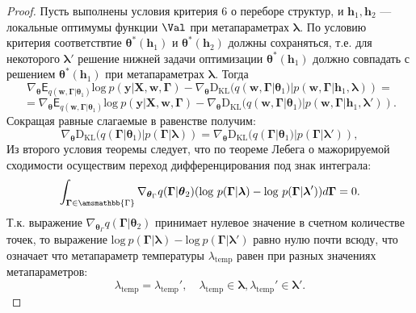 \begin{proof}
Пусть выполнены условия критерия 6 о переборе структур, и $\mathbf{h}_1, \mathbf{h}_2$ --- локальные оптимумы функции $\Val$ при метапараметрах $\boldsymbol{\lambda}$.
По условию критерия соответствтие $\boldsymbol{\theta}^{*}(\mathbf{h}_1)$ и $\boldsymbol{\theta}^{*}(\mathbf{h}_2)$ должны сохраняться, т.е. для некоторого $\boldsymbol{\lambda}'$ решение  нижней задачи оптимизации $\boldsymbol{\theta}^{*}(\mathbf{h}_1)$ должно совпадать с решением $\boldsymbol{\theta}^{*}(\mathbf{h}_1)$ при метапараметрах $\boldsymbol{\lambda}$. Тогда
\[
    \nabla_{\boldsymbol{\theta}} \mathsf{E}_{q(\mathbf{w}, \boldsymbol{\Gamma}|\boldsymbol{\theta}_1)} \text{log}~p(\mathbf{y}|\mathbf{X}, \mathbf{w}, \boldsymbol{\Gamma}) -\nabla_{\boldsymbol{\theta}}  \text{D}_{\text{KL}}(q(\mathbf{w}, \boldsymbol{\Gamma}|\boldsymbol{\theta}_1) | p(\mathbf{w}, \boldsymbol{\Gamma}|\mathbf{h}_1, \boldsymbol{\lambda})) = 
\]
\[
= \nabla_{\boldsymbol{\theta}} \mathsf{E}_{q(\mathbf{w}, \boldsymbol{\Gamma}|\boldsymbol{\theta}_1)} \text{log}~p(\mathbf{y}|\mathbf{X}, \mathbf{w}, \boldsymbol{\Gamma}) - \nabla_{\boldsymbol{\theta}}  \text{D}_{\text{KL}}(q(\mathbf{w}, \boldsymbol{\Gamma}|\boldsymbol{\theta}_1) | p(\mathbf{w}, \boldsymbol{\Gamma}|\mathbf{h}_1, \boldsymbol{\lambda}')).
\]
Сокращая равные слагаемые в равенстве получим:
\[
\nabla_{\boldsymbol{\theta}}  \text{D}_{\text{KL}}(q(\boldsymbol{\Gamma}|\boldsymbol{\theta}_1) | p(\boldsymbol{\Gamma}| \boldsymbol{\lambda})) = \nabla_{\boldsymbol{\theta}} \text{D}_{\text{KL}}(q(\boldsymbol{\Gamma}|\boldsymbol{\theta}_1) | p(\boldsymbol{\Gamma}| \boldsymbol{\lambda}')),
\] 
Из второго условия теоремы следует, что по теореме Лебега о мажорируемой сходимости осуществим переход дифференцирования под знак интеграла:
\[
\int_{\boldsymbol{\Gamma} \in \amsmathbb{\Gamma}} \nabla_{\boldsymbol{\theta}_\Gamma} q(\boldsymbol{\Gamma}|\boldsymbol{\theta}_2) (\text{log}~p(\boldsymbol{\Gamma}| \boldsymbol{\lambda}) - \text{log}~p(\boldsymbol{\Gamma}| \boldsymbol{\lambda}')) d\boldsymbol{\Gamma} = 0.
\]
Т.к. выражение $ \nabla_{\boldsymbol{\theta}_\Gamma} q(\boldsymbol{\Gamma}|\boldsymbol{\theta}_2)$ принимает нулевое значение в счетном количестве точек, то выражение $\text{log}~p(\boldsymbol{\Gamma}| \boldsymbol{\lambda}) - \text{log}~p(\boldsymbol{\Gamma}| \boldsymbol{\lambda}')$ равно нулю почти всюду, что означает что метапараметр температуры $\lambda_\text{temp}$  равен при разных значениях метапараметров:
\[
\lambda_\text{temp} = \lambda_\text{temp}',\quad \lambda_\text{temp} \in \boldsymbol{\lambda}, \lambda_\text{temp}' \in \boldsymbol{\lambda}'.
\]
\end{proof}
